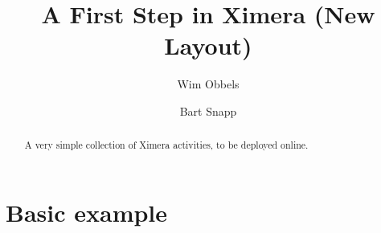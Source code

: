 \documentclass{xourse}
\author{Wim Obbels \and Bart Snapp}
\title{A First Step in Ximera (New Layout)}
\begin{document}
\begin{abstract}
    A very simple collection of Ximera activities, 
    to be deployed online.
\end{abstract}
\maketitle
\part{Basic example}

\chapterstyle
    \sectionstyle

    \chapterstyle
\end{document}
